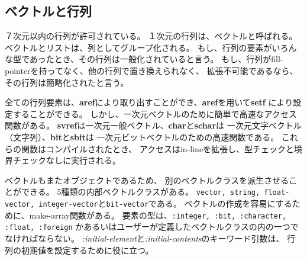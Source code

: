 \subsection{ベクトルと行列}

７次元以内の行列が許可されている。
１次元の行列は、ベクトルと呼ばれる。
ベクトルとリストは、列としてグループ化される。
もし、行列の要素がいろんな型であったとき、その行列は一般化されていると言う。
もし、行列がfill-pointerを持ってなく、他の行列で置き換えられなく、
拡張不可能であるなら、その行列は簡略化されたと言う。

全ての行列要素は、{\bf aref}により取り出すことができ、{\bf aref}を用いて{\bf setf}
により設定することができる。
しかし、一次元ベクトルのために簡単で高速なアクセス関数がある。
{\bf svref}は一次元一般ベクトル、{\bf char}と{\bf schar}は
一次元文字ベクトル（文字列）、{\bf bit}と{\bf sbit}は
一次元ビットベクトルのための高速関数である。
これらの関数はコンパイルされたとき、
アクセスはin-lineを拡張し、型チェックと境界チェックなしに実行される。

ベクトルもまたオブジェクトであるため、
別のベクトルクラスを派生させることができる。
5種類の内部ベクトルクラスがある。
{\tt vector, string, float-vector, integer-vector}と{\tt bit-vector}である。
ベクトルの作成を容易にするために、make-array関数がある。
要素の型は、{\tt :integer, :bit, :character, :float, :foreign}
かあるいはユーザーが定義したベクトルクラスの内の一つでなければならない。
{\em :initial-element}と{\em :initial-contents}のキーワード引数は、
行列の初期値を設定するために役に立つ。

